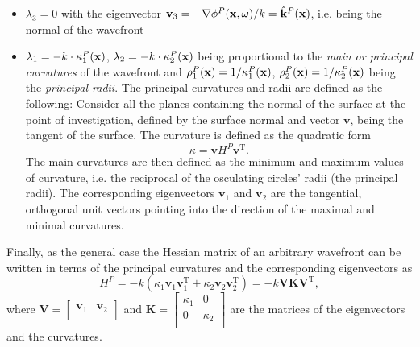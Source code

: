 \begin{itemize}
\item $\lambda_3 = 0$ with the eigenvector $\mathbf{v}_3 = - \nabla \phi^P(\mathbf{x},\omega) /k = \hat{\mathbf{k}}^P(\mathbf{x})$, i.e. being the normal of the wavefront
\item $\lambda_1 = -k \cdot \kappa^P_1(\mathbf{x})$, $\lambda_2 = -k \cdot	\kappa^P_2(\mathbf{x})$ being proportional to the \emph{main or principal curvatures} of the wavefront and $\rho^P_1(\mathbf{x}) = 1 /\kappa^P_1(\mathbf{x})$, $\rho^P_2(\mathbf{x}) = 1 /\kappa^P_2(\mathbf{x})$ being the \emph{principal radii}.
The principal curvatures and radii are defined as the following:
Consider all the planes containing the normal of the surface at the point of investigation, defined by the surface normal and vector $\mathbf{v}$, being the tangent of the surface.
The curvature is defined as the quadratic form 
\begin{equation}
\kappa = \mathbf{v} H^P \mathbf{v}^{\mathrm{T}}.
\label{Eq:App:curvature_def}
\end{equation}
The main curvatures are then defined as the minimum and maximum values of curvature, i.e. the reciprocal of the osculating circles' radii (the principal radii).
The corresponding eigenvectors $\mathbf{v}_1$ and $\mathbf{v}_2$ are the tangential, orthogonal unit vectors pointing into the direction of the maximal and minimal curvatures.
\end{itemize}
Finally, as the general case the Hessian matrix of an arbitrary wavefront can be written in terms of the principal curvatures and the corresponding eigenvectors as
\begin{equation}
H^P = -k \left( \kappa_1  \mathbf{v}_1 \mathbf{v}_1^\mathrm{T} + \kappa_2 \mathbf{v}_2 \mathbf{v}_2^\mathrm{T} \right) = -k \mathbf{V} \mathbf{K} \mathbf{V}^{\mathrm{T}},
\label{Eq:App:Hessian_w_curvature}
\end{equation}
where $\mathbf{V} = \begin{bmatrix} \mathbf{v}_1 & \mathbf{v}_2 \\\end{bmatrix}$ and $\mathbf{K} = \begin{bmatrix} \kappa_1 & 0 \\[.0em] 0 & \kappa_2 \\[0.0em] \end{bmatrix}$ are the matrices of the eigenvectors and the curvatures.

